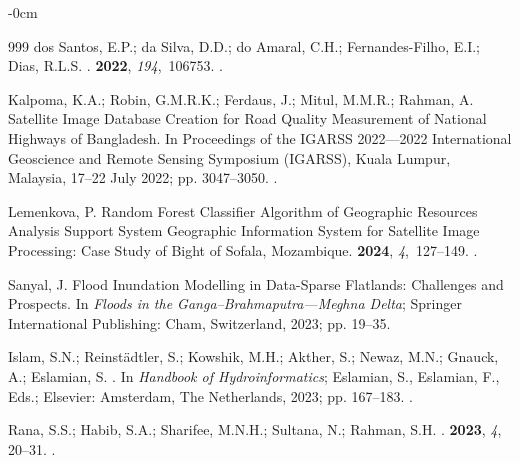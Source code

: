 \documentclass[water,article,accept,pdftex,oneauhor]{Definitions/mdpi}
\begin{document}
{{{\begin{adjustwidth}{-\extralength}{0cm}
\begin{thebibliography}{999}
{dos Santos}, E.P.; {da Silva}, D.D.; {do Amaral}, C.H.; Fernandes-Filho, E.I.;
  Dias, R.L.S.
.
 {\bf 2022}, {\em 194},~106753.
.

Kalpoma, K.A.; Robin, G.M.R.K.; Ferdaus, J.; Mitul, M.M.R.; Rahman, A.
\newblock Satellite Image Database Creation for Road Quality Measurement of
  National Highways of Bangladesh.
\newblock In Proceedings of the IGARSS 2022---2022 International Geoscience and Remote Sensing Symposium
  (IGARSS), Kuala Lumpur, Malaysia, 17--22 July 2022; %
 pp. 3047--3050.
.

Lemenkova, P.
\newblock Random Forest Classifier Algorithm of Geographic Resources Analysis
  Support System Geographic Information System for Satellite Image Processing:
  Case Study of Bight of Sofala, Mozambique.
 {\bf 2024}, {\em 4},~127--149.
.

Sanyal, J. Flood Inundation Modelling in Data-Sparse Flatlands: Challenges and
  Prospects.
\newblock In {\em Floods in the Ganga–Brahmaputra---Meghna Delta}; Springer
  International Publishing: Cham, Switzerland, 2023; pp. 19--35.

Islam, S.N.; Reinstädtler, S.; Kowshik, M.H.; Akther, S.; Newaz, M.N.; Gnauck,
  A.; Eslamian, S.
. In {\em Handbook of Hydroinformatics}; Eslamian,
  S., Eslamian, F., Eds.; Elsevier: Amsterdam, The Netherlands, %
  2023; pp. 167--183.
.

Rana, S.S.; Habib, S.A.; Sharifee, M.N.H.; Sultana, N.; Rahman, S.H.
.
 {\bf 2023}, \emph{4}, 20--31.
.


\end{thebibliography}
\end{adjustwidth}}}}
\end{document}

